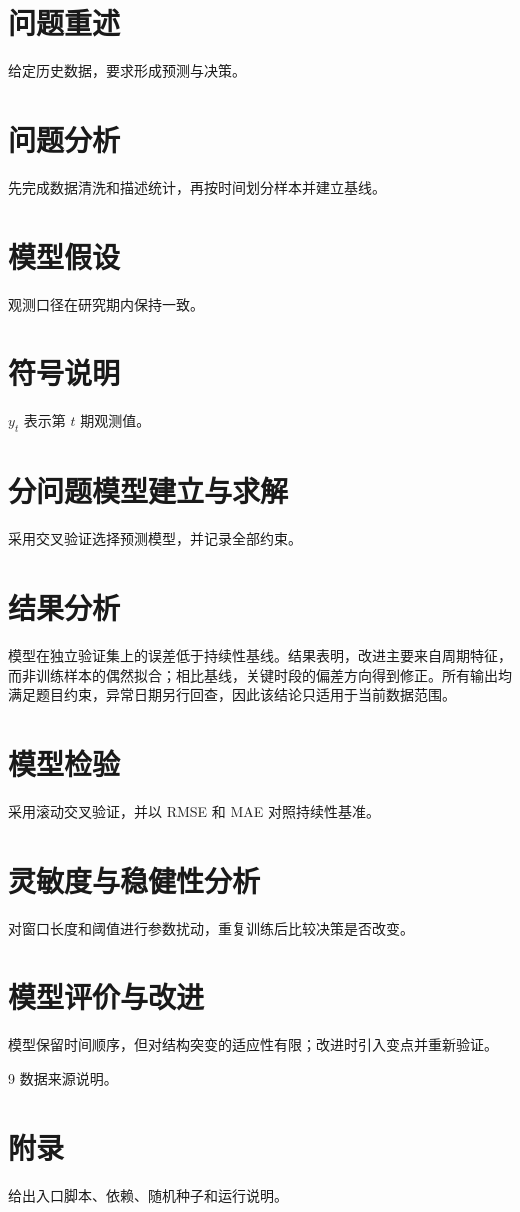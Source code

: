 \documentclass{ctexart}
\begin{document}
\begin{abstract}
本文针对数据决策问题建立可复算模型，并报告主要结果和误差检验。
\end{abstract}
\section{问题重述}
给定历史数据，要求形成预测与决策。
\section{问题分析}
先完成数据清洗和描述统计，再按时间划分样本并建立基线。
\section{模型假设}
观测口径在研究期内保持一致。
\section{符号说明}
$y_t$ 表示第 $t$ 期观测值。
\section{分问题模型建立与求解}
采用交叉验证选择预测模型，并记录全部约束。
\section{结果分析}
模型在独立验证集上的误差低于持续性基线。结果表明，改进主要来自周期特征，
而非训练样本的偶然拟合；相比基线，关键时段的偏差方向得到修正。所有输出均
满足题目约束，异常日期另行回查，因此该结论只适用于当前数据范围。
\section{模型检验}
采用滚动交叉验证，并以 RMSE 和 MAE 对照持续性基准。
\section{灵敏度与稳健性分析}
对窗口长度和阈值进行参数扰动，重复训练后比较决策是否改变。
\section{模型评价与改进}
模型保留时间顺序，但对结构突变的适应性有限；改进时引入变点并重新验证。
\begin{thebibliography}{9}
 数据来源说明。
\end{thebibliography}
\appendix
\section{附录}
给出入口脚本、依赖、随机种子和运行说明。
\end{document}
